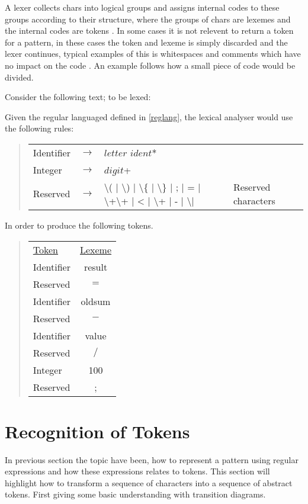 A lexer collects chars into logical groups and assigns 
internal codes to these groups according to their structure, 
where the groups of chars are lexemes and the internal codes are tokens \cite{sebesta2012}.
In some cases it is not relevent to return a token for a pattern, in these
cases the token and lexeme is simply discarded and the lexer continues,
typical examples of this is whitespaces and comments which have no impact on
the code \cite{Aho2006}.
An example follows how a small piece of code would be divided.
\begin{example} \label{codeToToken}$ $\\
Consider the following text; to be lexed:
\begin{quote}

\end{quote}
Given the regular languaged defined in \cref{reglang}, the lexical analyser would use the following rules:
\begin{quote}
\begin{tabular}{l c l l}
Identifier & $\rightarrow$ & $letter$ $ident$*\\
Integer    & $\rightarrow$ & $digit$+\\
Reserved   & $\rightarrow$ & \textbackslash( | \textbackslash) | \textbackslash\{
                         | \textbackslash\} | ; | = | \textbackslash+\textbackslash+
                         | < | \textbackslash+ | - | \textbackslash* | \/ & Reserved characters\\
\end{tabular}
\end{quote}
In order to produce the following tokens.
\begin{quote}
\begin{tabular}{l c}
\underline{Token} & \underline{Lexeme}\\
Identifier & result\\
Reserved & $=$\\
Identifier & oldsum\\
Reserved & $-$\\
Identifier & value\\
Reserved & $/$\\
Integer & 100\\
Reserved & ;
\end{tabular}
\end{quote}
\end{example}

\section{Recognition of Tokens}
In previous section the topic have been, how to represent a pattern using 
regular expressions and how these expressions relates to tokens. This section 
will highlight how to transform a sequence of characters into a sequence of 
abstract tokens. First giving some basic understanding with transition diagrams.  

